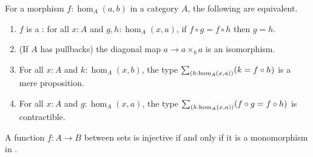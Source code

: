\documentclass[hott-all.tex]{subfiles}
\begin{document}
% 
% 
\begin{lem}
  For a morphism $f:\hom_A(a,b)$ in a category $A$, the following are equivalent.
  \begin{enumerate}
  \item $f$ is a :
    for all $x:A$ and ${g,h:\hom_A(x,a)}$, if $f\circ g = f\circ h$ then $g=h$.
  \item (If $A$ has pullbacks) the diagonal map $a\to a\times_b a$ is an isomorphism.
  \item For all $x:A$ and $k:\hom_A(x,b)$, the type $\sm{h:\hom_A(x,a)} (k = f\circ h)$ is a mere proposition.
  \item For all $x:A$ and ${g:\hom_A(x,a)}$, the type $\sm{h:\hom_A(x,a)} (f\circ g = f\circ h)$ is contractible.
  \end{enumerate}
\end{lem}
% 
\begin{lem}
  A function $f:A\to B$ between sets is injective if and only if it is a monomorphism in \uset.
\end{lem}
\end{document}
